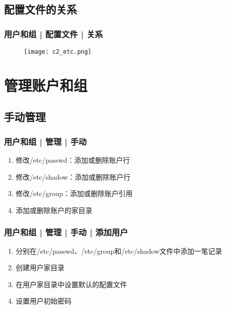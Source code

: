 \subsection{配置文件的关系}
\begin{frame}
  \frametitle{用户和组 | 配置文件 | \alert{关系}}
  \begin{figure}
    \centering
    \texttt{[image: c2\_etc.png]}
  \end{figure}
\end{frame}

\section{管理账户和组}
\subsection{手动管理}
\begin{frame}
  \frametitle{用户和组 | 管理 | 手动}
  \begin{enumerate}
    \item 修改/etc/passwd：添加或删除账户行
    \item 修改/etc/shadow：添加或删除账户行
    \item 修改/etc/group：添加或删除账户引用
    \item 添加或删除账户的家目录
  \end{enumerate}
\end{frame}

\begin{frame}
  \frametitle{用户和组 | 管理 | 手动 | 添加用户}
  \begin{enumerate}
    \item 分别在/etc/passwd、/etc/group和/etc/shadow文件中添加一笔记录
    \item 创建用户家目录
    \item 在用户家目录中设置默认的配置文件
    \item 设置用户初始密码
  \end{enumerate}
\end{frame}


